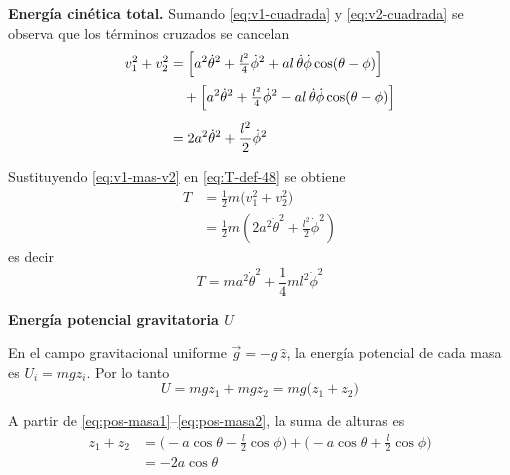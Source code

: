 \documentclass{article}
\begin{document}
\medskip
\textbf{Energía cinética total.} Sumando \eqref{eq:v1-cuadrada} y
\eqref{eq:v2-cuadrada} se observa que los términos cruzados se cancelan
\begin{equation}
\begin{split}
v_{1}^{2} + v_{2}^{2}
&= \Bigl[a^{2}\dot\theta^{2}
+ \tfrac{l^{2}}{4}\dot\phi^{2}
+ a l\,\dot\theta\dot\phi\cos(\theta-\phi)\Bigr]
 \\[2pt]
&\quad
+ \Bigl[a^{2}\dot\theta^{2}
+ \tfrac{l^{2}}{4}\dot\phi^{2}
- a l\,\dot\theta\dot\phi\cos(\theta-\phi)\Bigr] \\[4pt]
&= 2a^{2}\dot\theta^{2} + \frac{l^{2}}{2}\dot\phi^{2}
\end{split}
\label{eq:v1-mas-v2}
\end{equation}

Sustituyendo \eqref{eq:v1-mas-v2} en \eqref{eq:T-def-48} se obtiene
\begin{equation}
\begin{split}
T
&= \frac{1}{2}m\bigl(v_{1}^{2} + v_{2}^{2}\bigr) \\[4pt]
&= \frac{1}{2}m\left(2a^{2}\dot\theta^{2}
                  + \frac{l^{2}}{2}\dot\phi^{2}\right)
\end{split}
\label{eq:T-48-mid}
\end{equation}
es decir
\begin{equation}
T
= m a^{2}\dot\theta^{2}
+ \frac{1}{4}m l^{2}\dot\phi^{2}
\label{eq:T-48}
\end{equation}

\textcolor{trueblue}{\textbf{Energía potencial gravitatoria $U$}}

En el campo gravitacional uniforme $\vec g = -g\,\hat z$, la energía potencial
de cada masa es $U_{i} = m g z_{i}$. Por lo tanto
\begin{equation}
U = m g z_{1} + m g z_{2}
= m g\bigl(z_{1} + z_{2}\bigr)
\label{eq:U-def-48}
\end{equation}

A partir de \eqref{eq:pos-masa1}–\eqref{eq:pos-masa2}, la suma de alturas es
\begin{equation}
\begin{split}
z_{1} + z_{2}
&= \bigl(-a\cos\theta - \tfrac{l}{2}\cos\phi\bigr)
 + \bigl(-a\cos\theta + \tfrac{l}{2}\cos\phi\bigr) \\[4pt]
&= -2a\cos\theta
\end{split}
\label{eq:z1-mas-z2}
\end{equation}
\end{document}
